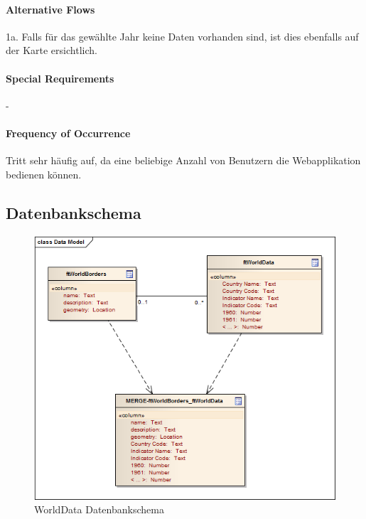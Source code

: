 \paragraph{Alternative Flows}
1a. Falls für das gewählte Jahr keine Daten vorhanden sind, ist dies ebenfalls auf der Karte ersichtlich.

\paragraph{Special Requirements}
-

\paragraph{Frequency of Occurrence}
Tritt sehr häufig auf, da eine beliebige Anzahl von Benutzern die Webapplikation bedienen können.

\subsection{Datenbankschema}
\begin{figure}[H]
	\centering
	\includegraphics[scale=0.8]{images/usecase1-worlddata/uml/worlddata-datamodel.png}
	\caption{WorldData Datenbankschema}
	\label{worlddata-datamodel}
\end{figure}

